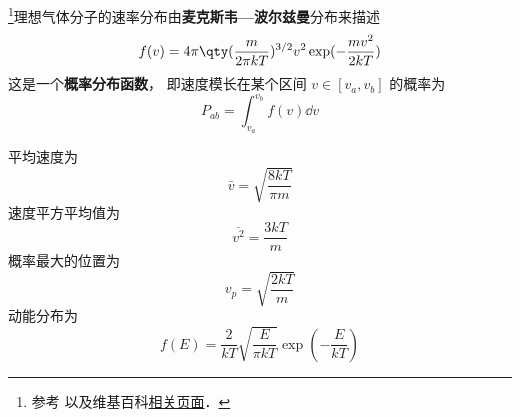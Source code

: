 
\begin{issues}
\issueDraft
\end{issues}

\footnote{参考 \cite{新热} 以及维基百科\href{https://en.wikipedia.org/wiki/Maxwell-Boltzmann_distribution}{相关页面}．}理想气体分子的速率分布由\textbf{麦克斯韦—波尔兹曼}分布来描述
\begin{equation}
f(v) = 4\pi \qty(\frac{m}{2\pi kT})^{3/2} v^2 \exp(-\frac{mv^2}{2kT})
\end{equation}
这是一个\textbf{概率分布函数}， 即速度模长在某个区间 $v \in [v_a, v_b]$ 的概率为
\begin{equation}
P_{ab} = \int_{v_a}^{v_b} f(v) \dd{v}
\end{equation}

平均速度为
\begin{equation}
\bar v = \sqrt{\frac{8kT}{\pi m}}
\end{equation}
速度平方平均值为
\begin{equation}
\overline {v^2} = \frac{3kT}{m}
\end{equation}
概率最大的位置为
\begin{equation}
v_p = \sqrt{\frac{2kT}{m}}
\end{equation}
动能分布为
\begin{equation}
f(E) = \frac{2}{kT}\sqrt{\frac{E}{\pi kT}} \exp(-\frac{E}{kT})
\end{equation}

